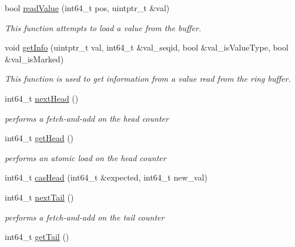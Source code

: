 \begin{DoxyCompactItemize}
\item 
bool \hyperlink{classtervel_1_1containers_1_1wf_1_1_ring_buffer_a7e82ecdcd6145daf90c8d49d04fd270d}{read\+Value} (int64\+\_\+t pos, uintptr\+\_\+t \&val)
\begin{DoxyCompactList}\small\item\em This function attempts to load a value from the buffer. \end{DoxyCompactList}\item 
void \hyperlink{classtervel_1_1containers_1_1wf_1_1_ring_buffer_a6f9c4dfd96a9b4c7c5aab52174171eb5}{get\+Info} (uintptr\+\_\+t val, int64\+\_\+t \&val\+\_\+seqid, bool \&val\+\_\+is\+Value\+Type, bool \&val\+\_\+is\+Marked)
\begin{DoxyCompactList}\small\item\em This function is used to get information from a value read from the ring buffer. \end{DoxyCompactList}\item 
int64\+\_\+t \hyperlink{classtervel_1_1containers_1_1wf_1_1_ring_buffer_a20683c75c286a8a22e97cbcbe5b8c787}{next\+Head} ()
\begin{DoxyCompactList}\small\item\em performs a fetch-\/and-\/add on the head counter \end{DoxyCompactList}\item 
int64\+\_\+t \hyperlink{classtervel_1_1containers_1_1wf_1_1_ring_buffer_a5f45b94d3225418fdec729f483db8c7c}{get\+Head} ()
\begin{DoxyCompactList}\small\item\em performs an atomic load on the head counter \end{DoxyCompactList}\item 
int64\+\_\+t \hyperlink{classtervel_1_1containers_1_1wf_1_1_ring_buffer_ae6ebc11d1ba6f884067ddc5b0b4e411f}{cas\+Head} (int64\+\_\+t \&expected, int64\+\_\+t new\+\_\+val)
\item 
int64\+\_\+t \hyperlink{classtervel_1_1containers_1_1wf_1_1_ring_buffer_a2b6cdb8a410b919e6aed90d130e3d4fa}{next\+Tail} ()
\begin{DoxyCompactList}\small\item\em performs a fetch-\/and-\/add on the tail counter \end{DoxyCompactList}\item 
int64\+\_\+t \hyperlink{classtervel_1_1containers_1_1wf_1_1_ring_buffer_ab757ccb32546ad168ff70295e53bb509}{get\+Tail} ()

\end{DoxyCompactItemize}
